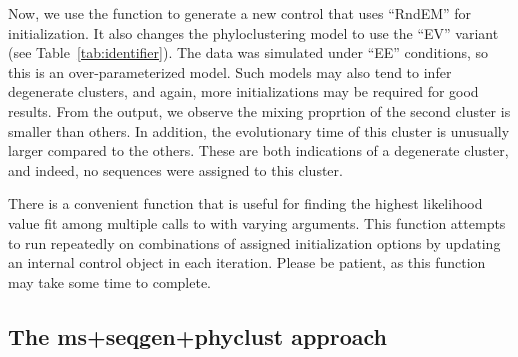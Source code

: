 Now, we use the function  to generate a
new control that uses ``RndEM'' for initialization.
It also changes the phyloclustering model to use the ``EV'' variant (see Table~\ref{tab:identifier}).
The data was simulated under ``EE'' conditions, so this is an over-parameterized model.
Such models may also tend to infer degenerate clusters,  and again, more initializations may be required for good results.
From the output, we observe
the mixing proprtion  of the second cluster is smaller than others.
In addition, the evolutionary time   of this cluster is unusually larger compared to the others.
These are both indications of a degenerate cluster, and indeed, no sequences were assigned to this cluster.

There is a convenient function  that is useful for finding
the highest likelihood value fit among multiple calls to  with varying arguments.
This function attempts to run  repeatedly on
combinations of assigned initialization options by updating
an internal  control object in each iteration.
Please be patient, as this function may take some time to complete.




\subsection[The ms+seqgen+phyclust approach]{The ms+seqgen+phyclust approach}
\label{sec:msseqgenphyclust}

